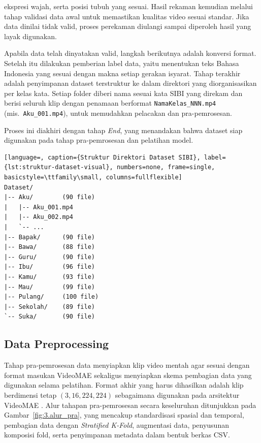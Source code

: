 ekspresi wajah, serta posisi tubuh yang sesuai. Hasil rekaman kemudian melalui tahap validasi data 
awal untuk memastikan kualitas video sesuai standar. Jika data dinilai tidak valid, proses perekaman 
diulangi sampai diperoleh hasil yang layak digunakan.\par
Apabila data telah dinyatakan valid, langkah berikutnya adalah konversi format. Setelah itu dilakukan pemberian label data, yaitu menentukan teks Bahasa Indonesia yang sesuai dengan makna setiap gerakan isyarat. Tahap terakhir adalah penyimpanan dataset terstruktur ke dalam direktori yang diorganisasikan per kelas kata. Setiap folder diberi nama sesuai kata SIBI yang direkam dan berisi seluruh klip dengan penamaan berformat \texttt{NamaKelas\_NNN.mp4} (mis.\ \texttt{Aku\_001.mp4}), untuk memudahkan pelacakan dan pra-pemrosesan.\par Proses ini diakhiri dengan tahap \textit{End}, yang menandakan bahwa dataset siap digunakan pada tahap pra-pemrosesan dan pelatihan model.\par
\begin{lstlisting}[language=, caption={Struktur Direktori Dataset SIBI}, label={lst:struktur-dataset-visual}, numbers=none, frame=single, basicstyle=\ttfamily\small, columns=fullflexible]
Dataset/
|-- Aku/        (90 file)
|   |-- Aku_001.mp4
|   |-- Aku_002.mp4
|   `-- ...
|-- Bapak/      (90 file)
|-- Bawa/       (88 file)
|-- Guru/       (90 file)
|-- Ibu/        (96 file)
|-- Kamu/       (93 file)
|-- Mau/        (99 file)
|-- Pulang/     (100 file)
|-- Sekolah/    (89 file)
`-- Suka/       (90 file)
\end{lstlisting}


\subsection{Data Preprocessing} \label{III.Data_Preprocessing}

Tahap pra-pemrosesan data menyiapkan klip video mentah agar sesuai dengan format masukan VideoMAE sekaligus menyiapkan skema pembagian data yang digunakan selama pelatihan. Format akhir yang harus dihasilkan adalah klip berdimensi tetap $(3,16,224,224)$ sebagaimana digunakan pada arsitektur VideoMAE \cite{Tong2022VideoMAE}. Alur tahapan pra-pemrosesan secara keseluruhan ditunjukkan pada Gambar~\ref{fig:3.alur_pra}, yang mencakup standardisasi spasial dan temporal, pembagian data dengan \textit{Stratified K-Fold}, augmentasi data, penyusunan komposisi fold, serta penyimpanan metadata dalam bentuk berkas CSV.\par

